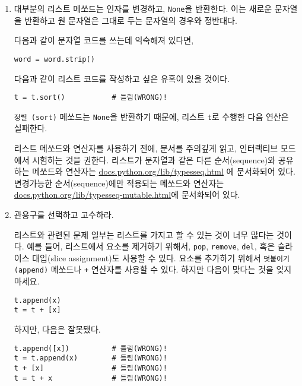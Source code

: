 \begin{enumerate}

\item 대부분의 리스트 메쏘드는 인자를 변경하고, {\tt None}을 반환한다. 이는 새로운 문자열을 반환하고 원 문자열은 그대로 두는 문자열의 경우와 정반대다.

다음과 같이 문자열 코드를 쓰는데 익숙해져 있다면,

\beforeverb
\begin{verbatim}
word = word.strip()
\end{verbatim}
\afterverb

다음과 같이 리스트 코드를 작성하고 싶은 유혹이 있을 것이다.

\beforeverb
\begin{verbatim}
t = t.sort()           # 틀림(WRONG)!
\end{verbatim}
\afterverb


{\tt 정렬 (sort)} 메쏘드는 {\tt None}을 반환하기 때문에, 리스트 {\tt t}로 수행한 다음 연산은 실패한다.

리스트 메쏘드와 연산자를 사용하기 전에, 문서를 주의깊게 읽고, 인터랙티브 모드에서 시험하는 것을 권한다.
리스트가 문자열과 같은 다른 순서(sequence)와 공유하는 메쏘드와 연산자는 \url{docs.python.org/lib/typesseq.html} 에 문서화되어 있다.
변경가능한 순서(sequence)에만 적용되는 메쏘드와 연산자는 \url{docs.python.org/lib/typesseq-mutable.html}에 문서화되어 있다.

\item 관용구를 선택하고 고수하라.

리스트와 관련된 문제 일부는 리스트를 가지고 할 수 있는 것이 너무 많다는 것이다.
예를 들어, 리스트에서 요소를 제거하기 위해서, {\tt pop}, {\tt remove}, {\tt del}, 혹은 슬라이스 대입(slice assignment)도 사용할 수 있다.
요소를 추가하기 위해서 {\tt 덧붙이기 (append)} 메쏘드나 {\tt +} 연산자를 사용할 수 있다. 
하지만 다음이 맞다는 것을 잊지 마세요.

\beforeverb
\begin{verbatim}
t.append(x)
t = t + [x]
\end{verbatim}
\afterverb

하지만, 다음은 잘못됐다.

\beforeverb
\begin{verbatim}
t.append([x])          # 틀림(WRONG)!
t = t.append(x)        # 틀림(WRONG)!
t + [x]                # 틀림(WRONG)!
t = t + x              # 틀림(WRONG)!
\end{verbatim}
\afterverb


\end{enumerate}
